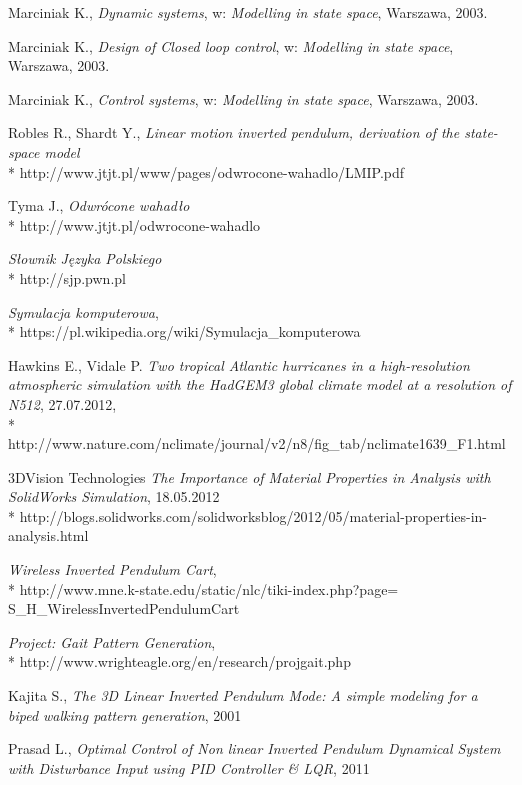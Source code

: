 \documentclass[12pt, oneside]{report}
\theoremstyle{definition}
\begin{document}
	
\pagestyle{plain}
\begin{thebibliography}{11}

 Marciniak K., \emph{Dynamic systems}, w: \emph{Modelling in state space}, Warszawa, 2003.

 Marciniak K., \emph{Design of Closed loop control}, w: \emph{Modelling in state space}, Warszawa, 2003.

 Marciniak K., \emph{Control systems}, w: \emph{Modelling in state space}, Warszawa, 2003.

 Robles R., Shardt Y., \emph{Linear motion inverted pendulum, derivation of the state-space model}
\\*
http://www.jtjt.pl/www/pages/odwrocone-wahadlo/LMIP.pdf

 Tyma J., \emph{Odwrócone wahadło}
\\*
http://www.jtjt.pl/odwrocone-wahadlo

 \emph{Słownik Języka Polskiego}
\\*
http://sjp.pwn.pl

 \emph{Symulacja komputerowa},
\\*
https://pl.wikipedia.org/wiki/Symulacja\_komputerowa

 Hawkins E., Vidale P. \emph{Two tropical Atlantic hurricanes in a high-resolution atmospheric simulation with the HadGEM3 global climate model at a resolution of N512}, 27.07.2012,
\\*
http://www.nature.com/nclimate/journal/v2/n8/fig\_tab/nclimate1639\_F1.html

 3DVision Technologies \emph{The Importance of Material Properties in Analysis with SolidWorks Simulation}, 18.05.2012
\\*
http://blogs.solidworks.com/solidworksblog/2012/05/material-properties-in-\\analysis.html

 \emph{Wireless Inverted Pendulum Cart},
\\*
http://www.mne.k-state.edu/static/nlc/tiki-index.php?page=\\S\_H\_WirelessInvertedPendulumCart

  \emph{Project: Gait Pattern Generation},
\\*
http://www.wrighteagle.org/en/research/projgait.php

 Kajita S., \emph{The 3D Linear Inverted Pendulum Mode: A simple modeling for a biped walking pattern generation}, 2001

 Prasad L., \emph{Optimal Control of Non linear Inverted Pendulum Dynamical System with Disturbance Input using PID Controller \& LQR}, 2011

\end{thebibliography}
\end{document}

